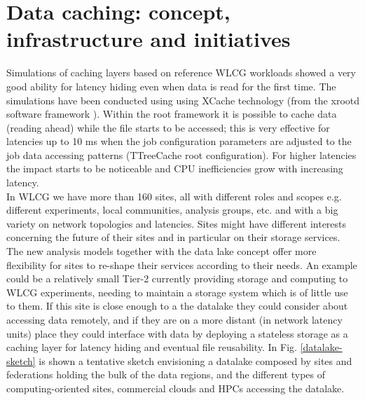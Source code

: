 \section{Data caching: concept, infrastructure and initiatives}
Simulations of caching layers based on reference WLCG workloads showed a very good ability for latency hiding even when data is read for the first time. The simulations have been conducted using using XCache technology (from the xrootd software framework \cite{xroot}).
Within the root framework \cite{root} it is possible to cache data (reading ahead) while the file starts to be accessed; this is very effective for latencies up to 10 ms when the job configuration parameters are adjusted to the job data accessing patterns (TTreeCache root configuration). For higher latencies the impact starts to be noticeable and CPU inefficiencies grow with increasing latency.\\
In WLCG we have more than 160 sites, all with different roles and scopes e.g. different experiments, local communities, analysis groups, etc. and with a big variety on network topologies and latencies. Sites might have different interests concerning the future of their sites and in particular on their storage services. The new analysis models together with the data lake concept offer more flexibility for sites to re-shape their services according to their needs. An example could be a relatively small Tier-2 currently providing storage and computing to WLCG experiments, needing to maintain a storage system which is of little use to them. If this site is close enough to a the datalake they could consider about accessing data remotely, and if they are on a more distant (in network latency units) place they could interface with data by deploying a stateless storage as a caching layer for latency hiding and eventual file reusability. In Fig. \ref{datalake-sketch} is shown a tentative sketch envisioning a datalake composed by sites and federations holding the bulk of the data regions, and the different types of computing-oriented sites, commercial clouds and HPCs accessing the datalake.\\

